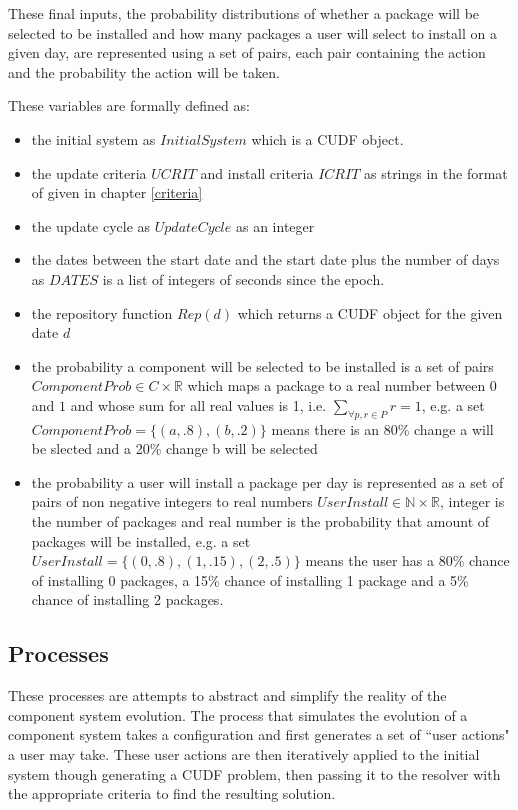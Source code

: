 These final inputs, the probability distributions of whether a package will be selected to be installed and how many packages a user will select to install on a given day,
are represented using a set of pairs, each pair containing the action and the probability the action will be taken.

These variables are formally defined as:
\begin{itemize}
  \item the initial system as $InitialSystem$ which is a CUDF object.
  \item the update criteria $UCRIT$ and install criteria $ICRIT$ as strings in the format of given in chapter \ref{criteria}
  \item the update cycle as $UpdateCycle$ as an integer
  \item the dates between the start date and the start date plus the number of days as $DATES$ is a list of integers of seconds since the epoch.
  \item the repository function $Rep(d)$ which returns a CUDF object for the given date $d$
  \item the probability a component will be selected to be installed is a set of pairs $ComponentProb \in C \times \mathbb{R}$ which maps a package to a real number between $0$ and $1$ 
  and whose sum for all real values is 1, i.e. $\sum_{\forall p,r \in P}r = 1$,
  e.g. a set $ComponentProb = \{ (a,.8) , (b,.2)\}$ means there is an 80\% change a will be slected and a 20\% change b will be selected
  \item the probability a user will install a package per day is represented as a set of pairs of non negative integers to real numbers $UserInstall \in \mathbb{N} \times \mathbb{R}$,
  integer is the number of packages and real number is the probability that amount of packages will be installed, 
  e.g.  a set $UserInstall = \{ (0,.8) , (1,.15), (2,.5)\}$ means the user has a 80\% chance of installing 0 packages, a 15\% chance of installing 1 package and a
  5\% chance of installing 2 packages.
\end{itemize} 


\subsection{Processes}
These processes are attempts to abstract and simplify the reality of the component system evolution.
The process that simulates the evolution of a component system takes a configuration and first generates a set of ``user actions" a user may take.
These user actions are then iteratively applied to the initial system though generating a CUDF problem,
then passing it to the resolver with the appropriate criteria to find the resulting solution.

